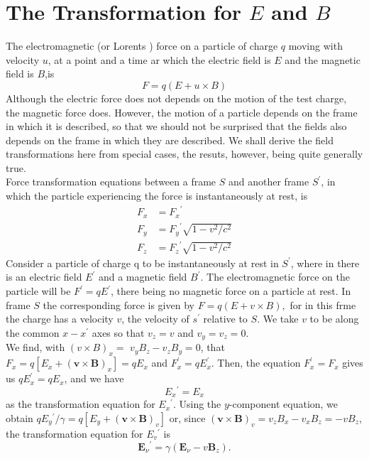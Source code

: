 \section{The Transformation for $E$ and $B$}
The electromagnetic (or Lorents ) force on a particle of charge $q$ moving with velocity $u$, at a point and a time ar which the electric field is $E$ and the magnetic field is $B$,is  
$$F=q(E+u\times B)$$
Although the electric force does not depends on the motion of the test charge, the magnetic force does. However, the motion of a particle depends on the frame in which it is described, so that we should not be surprised that the fields also depends on the frame in which they are described. We shall derive the field transformations here from special cases, the resuts, however, being quite generally true. \\
Force transformation equations between a frame $S$ and another frame $S^\prime$, in which the particle experiencing the force is instantaneously at rest, is
	\begin{align*}
	F_x&={F_x}^{\prime}\\
	F_y&={F_y}^{\prime}\sqrt{1-v^{2} / c^{2}}\\
	F_z&={F_z}^{\prime}\sqrt{1-v^{2} / c^{2}}
	\end{align*}
Consider a particle of charge q to be instantaneously at rest in $S^\prime$, where in there is an electric field $E^\prime$ and a magnetic field $B^\prime$. The electromagnetic force on the particle will be $F^\prime=qE^\prime$, there being no magnetic force on a particle at rest. In frame $S$ the corresponding force is given by $F=q(E+v\times B),$ for in this frme the charge has a velocity $v$, the velocity of $s^\prime$ relative to $S$. We take $v$ to be along the common $x-x^\prime$ axes so that $v_z=v$ and $v_y=v_z=0.$\\
 We find, with $(v \times B)_{x}=$ $v_{y} B_{z}-v_{z} B_{y}=0$, that $F_{x}=q\left[E_{x}+(\mathbf{v} \times \mathbf{B})_{x}\right]=q E_{x}$ and $F_{x}^{\prime}=q E_{x}^{\prime}$. Then, the equation $F_{x}^{\prime}=F_{x}$ gives us $q E_{x}^{\prime}=q E_{x}$, and we have
$$
E_{x}{ }^{\prime}=E_{x}
$$
as the transformation equation for $E_{x}{ }^{\prime}$.
Using the $y$-component equation, we obtain $q E_{y}{ }^{\prime} / \gamma=q\left[E_{y}+(\mathbf{v} \times \mathbf{B})_{v}\right]$ or, since $(\mathbf{v} \times \mathbf{B})_{v}=v_{z} B_{x}-v_{x} B_{z}=-v B_{z}$, the transformation equation for $E_{v}{ }^{\prime}$ is
$$
\boldsymbol{E}_{\nu}{ }^{\prime}=\gamma\left(\boldsymbol{E}_{\nu}-v \boldsymbol{B}_{z}\right) .
$$
